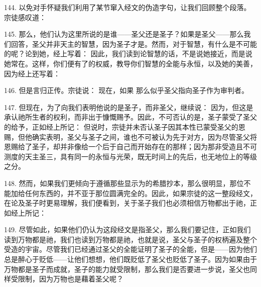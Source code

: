 144. 以免对手怀疑我们利用了某节窜入经文的伪造字句，让我们回顾整个段落。宗徒感叹道：\par

145. 那么，他们认为这里所说的是谁——圣父还是圣子？如果是圣父——那么我们回答，圣父并非天主的智慧，因为圣子才是。然而，对于智慧，有什么是不可能的呢？论到她，经上写着： 因此，我们读到论智慧的话，不是说她接近，而是说她常在。这样，你们便有了的权威，教导你们智慧的全能与永恒，以及她的美善，因为经上还写着：\par

146. 但是言归正传。宗徒说： 现在，如果 那么似乎圣父指向圣子作为审判者。\par

147. 但现在，为了向我们表明他说的是圣子，而非圣父，继续说： 因为，但这是承认祂所生者的权利，而非出于慷慨赐予。因此，不可否认的是，圣子蒙受了圣父的给予，正如经上所记： 但说时，宗徒并未否认圣子因其本性已蒙受圣父的恩赐，但他确实表明，圣父与圣子之间，谁也不可被认为先于对方，因为尽管圣父将恩赐给了圣子，却并非像给一个后于自己而开始存在的那样；因为那非受造且不可测度的天主圣三，具有同一的永恒与光荣，既无时间上的先后，也无地位上的等级之分。\par

148. 然而，如果我们更倾向于遵循那些显示为的希腊抄本，那么很明显，那位不能加给任何东西的，并不亚于那位圆满完全的。因此，如果宗徒的这一整段经文，在论及圣子时更易理解，我们便看到，关于圣子我们也必须相信万物都出于祂，正如经上所记：\par

149. 尽管如此，如果他们仍认为这段经文是指圣父，那么我们要记住，正如我们读到万物都是祂，我们也读到万物都是祂，也就是说，圣父与圣子的权柄遍及整个受造的宇宙。尽管我们已经通过圣父的全能证明了圣子的全能，但是——因为他们总是醉心于贬低——让他们想想，他们既贬低了圣父也贬低了圣子。因为如果由于万物都是圣子而成就，圣子的能力就受限制，那么我们是否要进一步说，圣父也同样受限制，因为万物也是藉着圣父呢？\par

